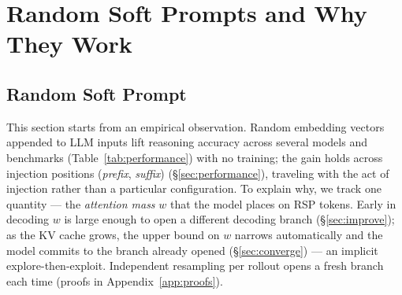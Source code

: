 
\section{Random Soft Prompts and Why They Work}\label{sec:why_rsp_works}

\subsection{Random Soft Prompt}\label{sec:rsp_definition}

This section starts from an empirical observation. Random embedding vectors appended to LLM inputs lift reasoning accuracy across several models and benchmarks (Table~\ref{tab:performance}) with no training; the gain holds across injection positions (\textit{prefix}, \textit{suffix}) (\S\ref{sec:performance}), traveling with the act of injection rather than a particular configuration. To explain why, we track one quantity --- the \emph{attention mass} $w$ that the model places on RSP tokens. Early in decoding $w$ is large enough to open a different decoding branch (\S\ref{sec:improve}); as the KV cache grows, the upper bound on $w$ narrows automatically and the model commits to the branch already opened (\S\ref{sec:converge}) --- an implicit explore-then-exploit. Independent resampling per rollout opens a fresh branch each time (proofs in Appendix~\ref{app:proofs}).

